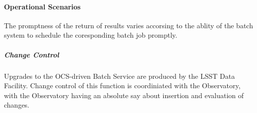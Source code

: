 \paragraph{Operational Scenarios}

The promptness of the return of results varies accorsing to the ablity
of the batch system to schedule the coresponding batch job promptly.

\subparagraph{Change Control}

Upgrades to the OCS-driven Batch Service are produced by the LSST Data Facility. Change control
of this function is coordiniated with the Observatory, with the Observatory having an absolute say
about insertion and evaluation of changes.
